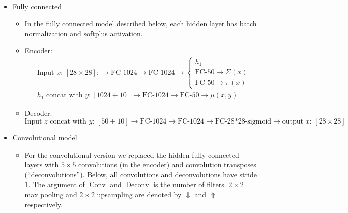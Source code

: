 \documentclass[10pt]{article}
\newcommand{\op}[1]{\operatorname{#1}}
\begin{document}
\begin{itemize}
	\item Fully connected
    \begin{itemize}
        \item In the fully connected model described below, each hidden layer has batch normalization and softplus activation.
        \item Encoder:
        \begin{align}
            &\text{Input $x$: $[28 \times 28]$}:
            \to
            \text{FC-1024}
            \to
            \text{FC-1024}
            \to
            \begin{cases}
            h_1\\
            \text{FC-50} \to \Sigma(x)\\
            \text{FC-50} \to \pi(x)
            \end{cases}\\
            &\text{$h_1$ concat with $y$}: [1024+10] \to
            \text{FC-1024}
            \to
            \text{FC-50}
            \to
            \mu(x,y)
        \end{align}
        \item Decoder:
        \begin{equation}
        \text{Input $z$ concat with $y$: $[50+10]$}
        \to
        \text{FC-1024}
        \to
        \text{FC-1024}
        \to
        \text{FC-28*28-sigmoid}
        \to
        \text{output $x$: $[28 \times 28]$}
        \end{equation}
    \end{itemize}
    \item Convolutional model
    \begin{itemize}
    	\item For the convolutional version we replaced the hidden fully-connected layers with $5\times 5$ convolutions (in the encoder) and convolution transposes (``deconvolutions''). Below, all convolutions and deconvolutions have stride $1$. The argument of $\op{Conv}$ and $\op{Deconv}$ is the number of filters. $2\times 2$ max pooling and $2\times 2$ upsampling are denoted by $\Downarrow$ and $\Uparrow$ respectively.

\end{itemize}
\end{itemize}
\end{document}
